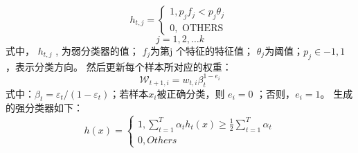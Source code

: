 \documentclass{article}
\begin{document}
$$h_{t, j}=\left\{\begin{array}{l}{1, p_{j} f_{j}<p_{j} \theta_{j}} \\ {0, \text { OTHERS }}\end{array}\right.$$
$$j=1,2, \ldots k$$
式中， $h_{t,j}$ , 为弱分类器的值； $f_j$为第j 个特征的特征值； $\theta_j$为阈值；$ p_j∈{−1,1} $，表示分类方向。
\newline\newline
然后更新每个样本所对应的权重：$$\mathcal{W}_{t+1, i}=w_{t, i} \beta_{t}^{1-e_{i}}$$
式中：$\beta_{t}=\varepsilon_{t} /\left(1-\varepsilon_{t}\right)$；若样本$x_i$被正确分类，则 $e_i=0$ ；否则，$e_i=1$。
生成的强分类器如下：
$$h(x)=\left\{\begin{array}{l}{1, \sum_{t=1}^{T} \alpha_{t} h_{t}(x) \geq \frac{1}{2} \sum_{t=1}^{T} \alpha_{t}} \\ {0,Others}\end{array}\right.$$
\end{document}
